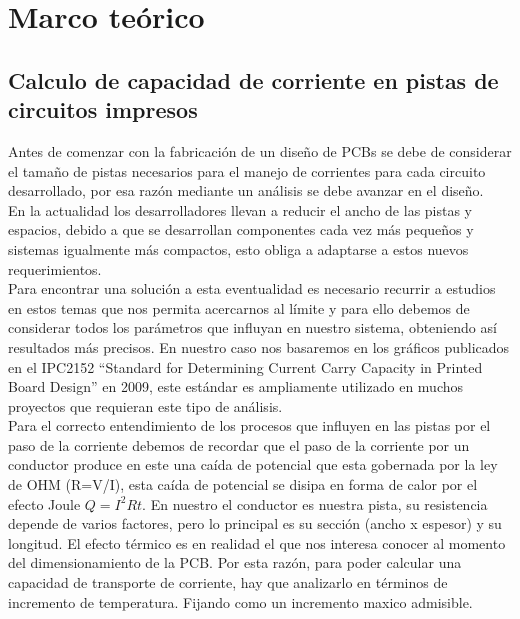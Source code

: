 

\chapter{Marco teórico}

\section{Calculo de capacidad de corriente en pistas de circuitos impresos}



Antes de comenzar con la fabricación de un diseño de PCBs se debe de considerar el tamaño de pistas necesarios para el manejo de corrientes para cada circuito desarrollado, por esa razón mediante un análisis se debe avanzar en el diseño.\\

En la actualidad los desarrolladores llevan a reducir el ancho de las pistas y espacios, debido a que se desarrollan componentes cada vez más pequeños y sistemas igualmente más compactos, esto obliga a adaptarse a estos nuevos requerimientos.\\

Para encontrar una solución a esta eventualidad es necesario recurrir a estudios en estos temas que nos permita acercarnos al límite y para ello debemos de considerar todos los parámetros que influyan en nuestro sistema, obteniendo así resultados más precisos. En nuestro caso nos basaremos en los gráficos publicados en el IPC2152 \cite{IPC 2152} ``Standard for Determining Current Carry Capacity in Printed Board Design'' en 2009, este estándar es ampliamente utilizado en muchos proyectos que requieran este tipo de análisis. \\

Para el correcto entendimiento de los procesos que influyen en las pistas por el paso de la corriente debemos de recordar que el paso de la corriente por un conductor produce en este una caída de potencial que esta gobernada por la ley de OHM (R=V/I), esta caída de potencial se disipa en forma de calor por el efecto Joule $Q=I^{2}Rt$. En nuestro el conductor es nuestra pista, su resistencia depende de varios factores, pero lo principal es su sección (ancho x espesor) y su longitud. El efecto térmico es en realidad el que nos interesa conocer al momento del dimensionamiento de la PCB. Por esta razón, para poder calcular una capacidad de transporte de corriente, hay que analizarlo en términos de incremento de temperatura. Fijando como un incremento maxico admisible.\\


